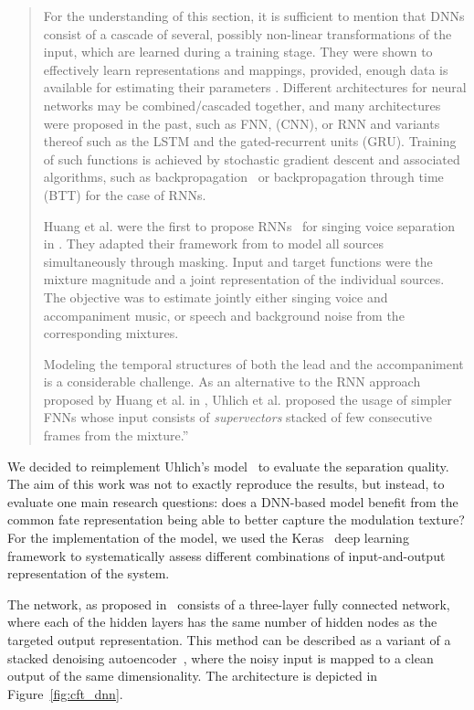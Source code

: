 \begin{quote}
  For the understanding of this section, it is sufficient to mention that DNNs consist of a cascade of several, possibly non-linear transformations of the input, which are learned during a training stage.
  They were shown to effectively learn representations and mappings, provided, enough data is available for estimating their parameters \cite{deng14, lecun15, goodfellow16}.
  Different architectures for neural networks may be combined/cascaded together, and many architectures were proposed in the past, such as \ac{FNN}, (\ac{CNN}), or \ac{RNN} and variants thereof such as the \ac{LSTM} and the gated-recurrent units (GRU).
  Training of such functions is achieved by stochastic gradient descent \cite{robbins51} and associated algorithms, such as backpropagation~\cite{rumelhart862} or backpropagation through time~\cite{rumelhart86} (BTT) for the case of \acs{RNN}s.
  \par
  Huang et al. were the first to propose \acs{RNN}s~\cite{hermans13,pascanu14} for singing voice separation in \cite{huang14,huang15}. They adapted their framework from \cite{huang142} to model all sources simultaneously through masking. Input and target functions were the mixture magnitude and a joint representation of the individual sources. The objective was to estimate jointly either singing voice and accompaniment music, or speech and background noise from the corresponding mixtures.
  \par
  Modeling the temporal structures of both the lead and the accompaniment is a considerable challenge. As an alternative to the \acs{RNN} approach proposed by Huang et al. in \cite{huang14}, Uhlich et al. proposed the usage of simpler \acs{FNN}s \cite{uhlich15} whose input consists of \textit{supervectors} stacked of few consecutive frames from the mixture.''
\end{quote}

We decided to reimplement Uhlich's model~\cite{uhlich15} to evaluate the separation quality.
The aim of this work was not to exactly reproduce the results, but instead, to evaluate one main research questions: does a DNN-based model benefit from the common fate representation being able to better capture the modulation texture?
For the implementation of the model, we used the Keras~\cite{chollet15} deep learning framework to systematically assess different combinations of input-and-output representation of the system.
\par
The network, as proposed in~\cite{uhlich15} consists of a three-layer fully connected network, where each of the hidden layers has the same number of hidden nodes as the targeted output representation.
This method can be described as a variant of a stacked denoising autoencoder~\cite{pvincent08}, where the noisy input is mapped to a clean output of the same dimensionality.
The architecture is depicted in Figure~\ref{fig:cft_dnn}. 

